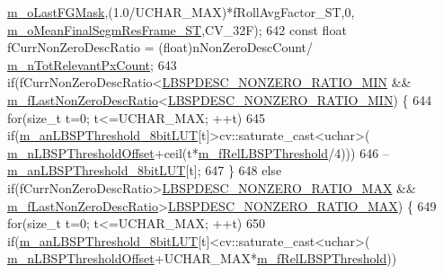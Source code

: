 \begin{DoxyCode}
      \mbox{\hyperlink{class_background_subtractor_l_b_s_p_adb6dc0af596c5592c91f9d8faa5c8a4b}{m\_oLastFGMask}},(1.0/UCHAR\_MAX)*fRollAvgFactor\_ST,0,
      \mbox{\hyperlink{class_background_subtractor_su_b_s_e_n_s_e_a0dcd4f5df8adb9b4fa630a9a6f6b5e30}{m\_oMeanFinalSegmResFrame\_ST}},CV\_32F);
642     \textcolor{keyword}{const} \textcolor{keywordtype}{float} fCurrNonZeroDescRatio = (float)nNonZeroDescCount/
      \mbox{\hyperlink{class_background_subtractor_l_b_s_p_ac3b54f4d2dfa3a576475214f26501d85}{m\_nTotRelevantPxCount}};
643     \textcolor{keywordflow}{if}(fCurrNonZeroDescRatio<\mbox{\hyperlink{_background_subtractor_su_b_s_e_n_s_e_8cpp_a792ccbdc08e1e874e0e01f98e7ec3d2e}{LBSPDESC\_NONZERO\_RATIO\_MIN}} && 
      \mbox{\hyperlink{class_background_subtractor_su_b_s_e_n_s_e_a4231d025a90be64a703f3f0aff1345c8}{m\_fLastNonZeroDescRatio}}<\mbox{\hyperlink{_background_subtractor_su_b_s_e_n_s_e_8cpp_a792ccbdc08e1e874e0e01f98e7ec3d2e}{LBSPDESC\_NONZERO\_RATIO\_MIN}}) \{
644         \textcolor{keywordflow}{for}(\textcolor{keywordtype}{size\_t} t=0; t<=UCHAR\_MAX; ++t)
645             \textcolor{keywordflow}{if}(\mbox{\hyperlink{class_background_subtractor_l_b_s_p_aefe69d94f08b2c4ba73ad1d254ad9153}{m\_anLBSPThreshold\_8bitLUT}}[t]>cv::saturate\_cast<uchar>(
      \mbox{\hyperlink{class_background_subtractor_l_b_s_p_a209eb6aaa34e8ad8e565e79f85404e24}{m\_nLBSPThresholdOffset}}+ceil(t*\mbox{\hyperlink{class_background_subtractor_l_b_s_p_ad759c645b14e9b16bf3940cae862df32}{m\_fRelLBSPThreshold}}/4)))
646                 --\mbox{\hyperlink{class_background_subtractor_l_b_s_p_aefe69d94f08b2c4ba73ad1d254ad9153}{m\_anLBSPThreshold\_8bitLUT}}[t];
647     \}
648     \textcolor{keywordflow}{else} \textcolor{keywordflow}{if}(fCurrNonZeroDescRatio>\mbox{\hyperlink{_background_subtractor_su_b_s_e_n_s_e_8cpp_a2ea7c0dd116ae4aa27401193f54919ec}{LBSPDESC\_NONZERO\_RATIO\_MAX}} && 
      \mbox{\hyperlink{class_background_subtractor_su_b_s_e_n_s_e_a4231d025a90be64a703f3f0aff1345c8}{m\_fLastNonZeroDescRatio}}>\mbox{\hyperlink{_background_subtractor_su_b_s_e_n_s_e_8cpp_a2ea7c0dd116ae4aa27401193f54919ec}{LBSPDESC\_NONZERO\_RATIO\_MAX}}) \{
649         \textcolor{keywordflow}{for}(\textcolor{keywordtype}{size\_t} t=0; t<=UCHAR\_MAX; ++t)
650             \textcolor{keywordflow}{if}(\mbox{\hyperlink{class_background_subtractor_l_b_s_p_aefe69d94f08b2c4ba73ad1d254ad9153}{m\_anLBSPThreshold\_8bitLUT}}[t]<cv::saturate\_cast<uchar>(
      \mbox{\hyperlink{class_background_subtractor_l_b_s_p_a209eb6aaa34e8ad8e565e79f85404e24}{m\_nLBSPThresholdOffset}}+UCHAR\_MAX*\mbox{\hyperlink{class_background_subtractor_l_b_s_p_ad759c645b14e9b16bf3940cae862df32}{m\_fRelLBSPThreshold}}))

\end{DoxyCode}
